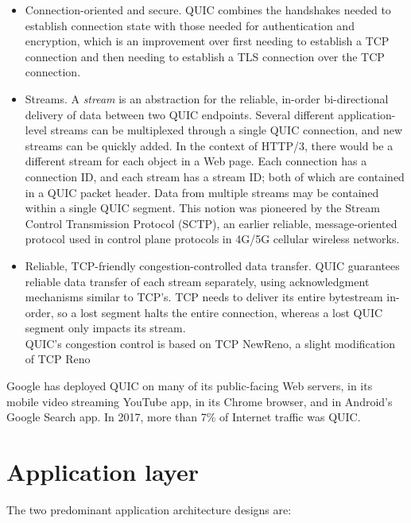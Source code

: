 \documentclass[8pt, table, xcdraw]{article}%
\begin{document}
\begin{itemize}
    \item Connection-oriented and secure. QUIC combines the handshakes needed to establish connection state with those needed for authentication and encryption, which is an improvement over first needing to establish a TCP connection and then needing to establish a TLS connection over the TCP connection.
    \item Streams. A \emph{stream} is an abstraction for the reliable, in-order bi-directional delivery of data between two QUIC endpoints. Several different application-level streams can be multiplexed through a single QUIC connection, and new streams can be quickly added. In the context of HTTP/3, there would be a different stream for each object in a Web page. Each connection has a connection ID, and each stream has a stream ID; both of which are contained in a QUIC packet header. Data from multiple streams may be contained within a single QUIC segment. This notion was pioneered by the Stream Control Transmission Protocol (SCTP), an earlier reliable, message-oriented protocol used in control plane protocols in 4G/5G cellular wireless networks.
    \item Reliable, TCP-friendly congestion-controlled data transfer. QUIC guarantees reliable data transfer of each stream separately, using acknowledgment mechanisms similar to TCP’s. TCP needs to deliver its entire bytestream in-order, so a lost segment halts the entire connection, whereas a lost QUIC segment only impacts its stream.\\
    QUIC’s congestion control is based on TCP NewReno, a slight modification of TCP Reno
\end{itemize}

Google has deployed QUIC on many of its public-facing Web servers, in its mobile video streaming YouTube app, in its Chrome browser, and in Android’s Google Search app. In 2017, more than 7\% of Internet traffic was QUIC.

\section{Application layer} \label{ch:application}

The two predominant application architecture designs are:
\end{document}
